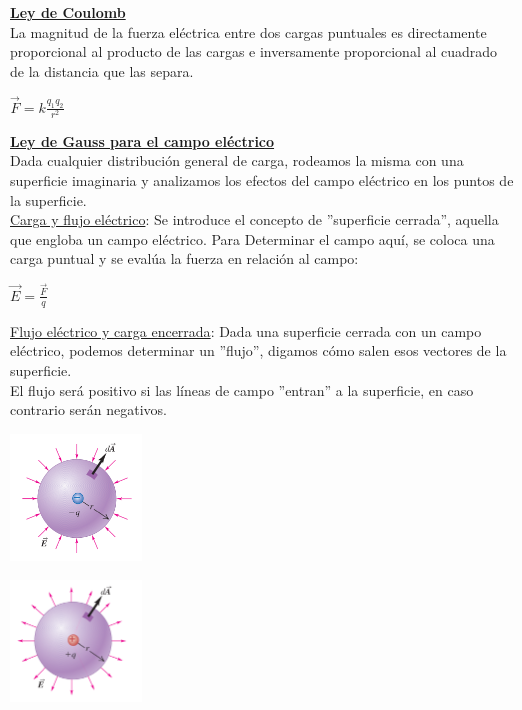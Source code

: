 \documentclass[a4paper]{article}
\begin{document}
\begin{multicols}{2}
            \textbf{\underline{Ley de Coulomb}} \\[10pt]
                \indent La magnitud de la fuerza eléctrica entre dos cargas puntuales es directamente proporcional al producto de las cargas e inversamente proporcional al cuadrado de la distancia que las separa.

                \begin{center} $\vec{F} = k{\frac{q_1q_2}{r^2}}$ \end{center}

                \textbf{\underline{Ley de Gauss para el campo eléctrico}} \\[10pt] \indent Dada cualquier distribución general de carga, rodeamos la misma con una superficie imaginaria y analizamos los efectos del campo eléctrico en los puntos de la superficie. \\ 

                \underline{Carga y flujo eléctrico}: Se introduce el concepto de ''superficie cerrada'', aquella que engloba un campo eléctrico. Para Determinar el campo aquí, se coloca una carga puntual y se evalúa la fuerza en relación al campo: \\
                    \begin{center} $\vec{E} = \frac{\vec{F}}{q}$ \end{center}

                \underline{Flujo eléctrico y carga encerrada}: Dada una superficie cerrada con un campo eléctrico, podemos determinar un ''flujo'', digamos cómo salen esos vectores de la superficie. \\ \indent El flujo será positivo si las líneas de campo ''entran'' a la superficie, en caso contrario serán negativos.
                    \begin{center} \includegraphics[width=3.5cm]{../imagenes/campoElectricoEntrante.png} \end{center}
                    \begin{center} \includegraphics[width=3.5cm]{../imagenes/campoElectricoSaliente.png} \end{center}
                    

\end{multicols}
\end{document}
